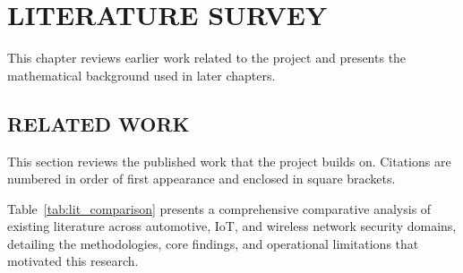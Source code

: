 \documentclass[11pt,a4paper]{report}
\begin{document}
\clearpage

\chapter{LITERATURE SURVEY}
This chapter reviews earlier work related to the project and presents the mathematical background used in later chapters.

\section{RELATED WORK}
This section reviews the published work that the project builds on. Citations are numbered in order of first appearance and enclosed in square brackets.

Table~\ref{tab:lit_comparison} presents a comprehensive comparative analysis of existing literature across automotive, IoT, and wireless network security domains, detailing the methodologies, core findings, and operational limitations that motivated this research.
\end{document}
